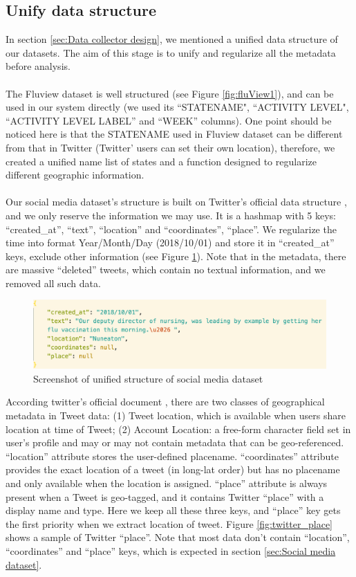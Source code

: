 \subsection{Unify data structure}
\label{sec:Unify data structure}
In section \ref{sec:Data collector design}, we mentioned a unified data structure of our datasets. The aim of this stage is to unify and regularize all the metadata before analysis. \\
\\The Fluview dataset is well structured (see Figure \ref{fig:fluView1}), and can be used in our system directly (we used its ``STATENAME", ``ACTIVITY LEVEL", ``ACTIVITY LEVEL LABEL'' and ``WEEK'' columns). One point should be noticed here is that the STATENAME used in Fluview dataset can be different from that in Twitter (Twitter' users can set their own location), therefore, we created a unified name list of states and a function designed to regularize different geographic information.\\
\\
Our social media dataset's structure is built on Twitter's official data structure \cite{twitter_dev}, and we only reserve the information we may use. It is a hashmap with 5 keys: ``created\_at'', ``text'', ``location'' and ``coordinates'', ``place''. We regularize the time into format Year/Month/Day (2018/10/01) and store it in ``created\_at'' keys, exclude other information (see Figure \ref{fig:social_data_sture}). Note that in the metadata, there are massive ``deleted'' tweets, which contain no textual information, and we removed all such data.
\begin{figure}[!bp]
    \centering
    \includegraphics[width=5in]{images/dataset1.png}
    \caption{Screenshot of unified structure of social media dataset}
    \label{fig:social_data_sture}
\end{figure}
According twitter's official document \cite{twitter_dev}, there are two classes of geographical metadata in Tweet data: (1) Tweet location, which is available when users share location at time of Tweet; (2) Account Location: a free-form character field set in user's profile and may or may not contain metadata that can be geo-referenced. ``location'' attribute stores the user-defined placename. ``coordinates'' attribute provides the exact location of a tweet (in long-lat order) but has no placename and only available when the location is assigned. ``place'' attribute is always present when a Tweet is geo-tagged, and it contains Twitter ``place'' with a display name and type. Here we keep all these three keys, and ``place'' key gets the first priority when we extract location of tweet. Figure \ref{fig:twitter_place} shows a sample of Twitter ``place''. Note that most data don't contain ``location'', ``coordinates'' and ``place'' keys, which is expected in section \ref{sec:Social media dataset}.
